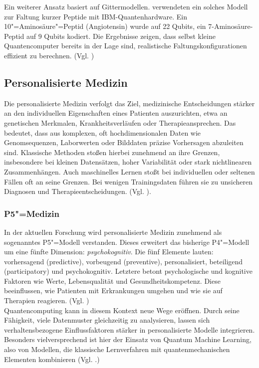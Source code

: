Ein weiterer Ansatz basiert auf Gittermodellen. \citeauthor{robert_resource-efficient_2021} verwendeten ein solches Modell zur Faltung kurzer Peptide mit IBM-Quantenhardware. Ein 10"=Aminosäure"=Peptid (Angiotensin) wurde auf 22 Qubits, ein 7-Aminosäure-Peptid auf 9 Qubits kodiert. Die Ergebnisse zeigen, dass selbst kleine Quantencomputer bereits in der Lage sind, realistische Faltungskonfigurationen effizient zu berechnen. (Vgl. \cite{robert_resource-efficient_2021})


\subsection{Personalisierte Medizin}
Die personalisierte Medizin verfolgt das Ziel, medizinische Entscheidungen stärker an den individuellen Eigenschaften eines Patienten auszurichten, etwa an genetischen Merkmalen, Krankheitsverläufen oder Therapieansprechen. Das bedeutet, dass aus komplexen, oft hochdimensionalen Daten wie Genomsequenzen, Laborwerten oder Bilddaten präzise Vorhersagen abzuleiten sind. Klassische Methoden stoßen hierbei zunehmend an ihre Grenzen, insbesondere bei kleinen Datensätzen, hoher Variabilität oder stark nichtlinearen Zusammenhängen. Auch maschinelles Lernen stoßt bei individuellen oder seltenen Fällen oft an seine Grenzen. Bei wenigen Trainingsdaten führen sie zu unsicheren Diagnosen und Therapieentscheidungen. (Vgl. \cite{gupta_systematic_2025}).\\

\subsubsection*{P5"=Medizin}
In der aktuellen Forschung wird personalisierte Medizin zunehmend als sogenanntes P5"=Modell verstanden. Dieses erweitert das bisherige P4"=Modell um eine fünfte Dimension: \textit{psychokognitiv}. Die fünf Elemente lauten: vorhersagend (predictive), vorbeugend (preventive), personalisiert, beteiligend (participatory) und psychokognitiv. Letztere betont psychologische und kognitive Faktoren wie Werte, Lebensqualität und Gesundheitskompetenz. Diese beeinflussen, wie Patienten mit Erkrankungen umgehen und wie sie auf Therapien reagieren. (Vgl. \cite{gorini_p5_2011})\\

Quantencomputing kann in diesem Kontext neue Wege eröffnen. Durch seine Fähigkeit, viele Datenmuster gleichzeitig zu analysieren, lassen sich verhaltensbezogene Einflussfaktoren stärker in personalisierte Modelle integrieren. Besonders vielversprechend ist hier der Einsatz von Quantum Machine Learning, also von Modellen, die klassische Lernverfahren mit quantenmechanischen Elementen kombinieren (Vgl. \cite{bertl_quantum_2025}.)\\

